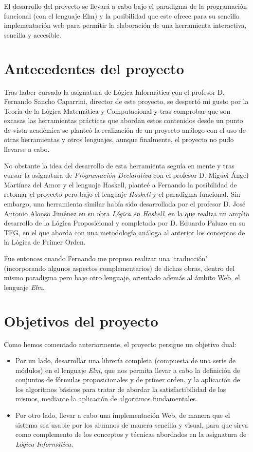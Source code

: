 \documentclass[a4paper]{report}
\begin{document}
El desarrollo del proyecto se llevará a cabo bajo el paradigma de la programación funcional (con el lenguaje Elm) y la posibilidad que este ofrece para su sencilla implementación web para permitir la elaboración de una herramienta interactiva, sencilla y accesible.

\section{Antecedentes del proyecto}

Tras haber cursado la asignatura de Lógica Informática con el profesor D. Fernando Sancho Caparrini, director de este proyecto, se despertó mi gusto por la Teoría de la Lógica Matemática y Computacional y tras comprobar que son excasas las herramientas prácticas que abordan estos contenidos desde un punto de vista académica se planteó la realización de un proyecto análogo con el uso de otras herramientas y otros lenguajes, aunque finalmente, el proyecto no pudo llevarse a cabo.

No obstante la idea del desarrollo de esta herramienta seguía en mente y tras cursar la asignatura de \textit{Programación Declarativa} con el profesor D. Miguel Ángel Martínez del Amor y el lenguaje Haskell, planteé a Fernando la posibilidad de retomar el proyecto pero bajo el lenguaje \textit{Haskell} y el paradigma funcional. Sin embargo, una herramienta similar había sido desarrollada por el profesor D. José Antonio Alonso Jiménez en su obra \textit{Lógica en Haskell}, en la que realiza un amplio desarrollo de la Lógica Proposicional y completada por D. Eduardo Paluzo en su TFG, en el que aborda con una metodología análoga al anterior los conceptos de la Lógica de Primer Orden. 

Fue entonces cuando Fernando me propuso realizar una `traducción' (incorporando algunos aspectos complementarios) de dichas obras, dentro del mismo paradigma pero bajo otro lenguaje, orientado además al ámbito Web, el lenguaje \textit{Elm}.

\section{Objetivos del proyecto}
Como hemos comentado anteriormente, el proyecto persigue un objetivo dual:

\begin{itemize}
\item Por un lado, desarrollar una librería completa (compuesta de una serie de módulos) en el lenguaje \textit{Elm}, que nos permita llevar a cabo la definición de conjuntos de fórmulas proposicionales y de primer orden, y la aplicación de los algoritmos básicos para tratar de abordar la satisfactibilidad de los mismos, mediante la aplicación de algoritmos fundamentales.

\item Por otro lado, llevar a cabo una implementación Web, de manera que el sistema sea usable por los alumnos de manera sencilla y visual, para que sirva como complemento de los conceptos y técnicas abordados en la asignatura de \textit{Lógica Informática.}
\end{itemize}
\end{document}
